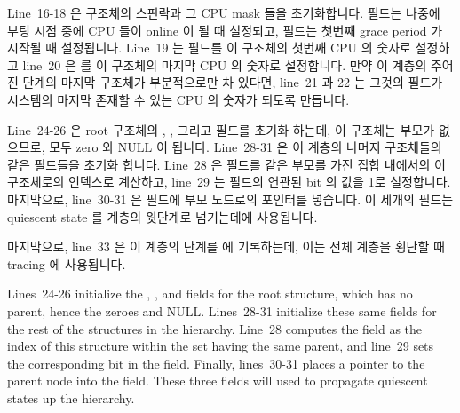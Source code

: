 Line~16-18 은  구조체의 스핀락과 그 CPU mask 들을 초기화합니다.
 필드는 나중에 부팅 시점 중에 CPU 들이 online 이 될 때 설정되고,
 필드는 첫번째 grace period 가 시작될 때 설정됩니다.
Line~19 는  필드를 이  구조체의 첫번째 CPU 의 숫자로
설정하고 line~20 은  를 이  구조체의 마지막 CPU 의
숫자로 설정합니다.
만약 이 계층의 주어진 단계의 마지막  구조체가 부분적으로만 차
있다면, line~21 과 22 는 그것의  필드가 시스템의 마지막 존재할 수
있는 CPU 의 숫자가 되도록 만듭니다.
\iffalse

Lines~16-18 initialize the \co{rcu_node} structure's spinlock and
its CPU masks.
The \co{qsmaskinit} field will have bits set as CPUs come online
later in boot, and the \co{qsmask} field will have bits set
when the first grace period starts.
Line~19 sets the \co{->grplo} field to the number of the this
\co{rcu_node} structure's first CPU and line~20 sets the
\co{->grphi} to the number of this \co{rcu_node} structure's
last CPU.
If the last \co{rcu_node} structure on a given level of the
hierarchy is only partially full, lines~21 and 22 set its
\co{->grphi} field to the number of the last possible CPU in the system.
\fi

Line~24-26 은 root  구조체의 , , 그리고
 필드를 초기화 하는데, 이 구조체는 부모가 없으므로, 모두 zero 와
NULL 이 됩니다.
Line~28-31 은 이 계층의 나머지  구조체들의 같은 필드들을 초기화
합니다.
Line~28 은  필드를 같은 부모를 가진 집합 내에서의 이 
구조체로의 인덱스로 계산하고, line~29 는  필드의 연관된 bit 의
값을 1로 설정합니다.
마지막으로, line~30-31 은  필드에 부모 노드로의 포인터를 넣습니다.
이 세개의 필드는 quiescent state 를 계층의 윗단계로 넘기는데에 사용됩니다.

마지막으로, line~33 은 이 계층의 단계를  에 기록하는데, 이는 전체
계층을 횡단할 때 tracing 에 사용됩니다.
\iffalse

Lines~24-26 initialize the , , and
 fields for the root  structure, which
has no parent, hence the zeroes and NULL.
Lines~28-31 initialize these same fields for the rest of the
 structures in the hierarchy.
Line~28 computes the  field as the index of this
 structure within
the set having the same parent, and
line~29 sets the corresponding bit in the  field.
Finally, lines~30-31 places a pointer to the parent node into the
 field.
These three fields will used to propagate quiescent states up the
hierarchy.

